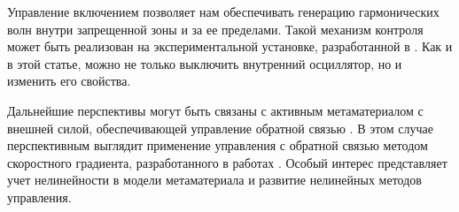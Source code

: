 Управление включением позволяет нам обеспечивать генерацию гармонических волн внутри запрещенной зоны и за ее пределами. Такой механизм контроля может быть реализован на экспериментальной установке, разработанной в \cite{Yang}. Как и в этой статье, можно не только выключить внутренний осциллятор, но и изменить его свойства.

Дальнейшие перспективы могут быть связаны с активным метаматериалом с внешней силой, обеспечивающей управление обратной связью \cite{Pope2012, Pope2014}. В этом случае перспективным выглядит применение управления с обратной связью методом скоростного градиента, разработанного в работах \cite{bound_fradkov, porant16}. Особый интерес представляет учет нелинейности в модели метаматериала и развитие нелинейных методов управления.